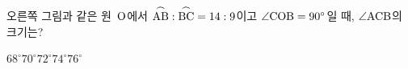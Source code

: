 \noindent\begin{minipage}[t]{0.58\linewidth}\vspace{0pt}\raggedright 오른쪽 그림과 같은 원~$\mathrm{O}$에서 $\overset{\frown}{\mathrm{AB}}:\overset{\frown}{\mathrm{BC}}=14:9$이고 $\angle\mathrm{COB}=90^\circ$일 때, $\angle\mathrm{ACB}$의 크기는?\end{minipage}\hfill\begin{minipage}[t]{0.4\linewidth}\vspace{0pt}\centering \resizebox{\ifdim\width>\linewidth\linewidth\else\width\fi}{!}{}\end{minipage}\par
\begin{choices32}{$68^\circ$}{$70^\circ$}{$72^\circ$}{$74^\circ$}{$76^\circ$}\end{choices32}
